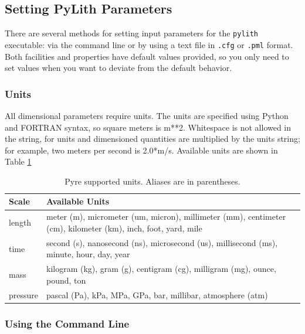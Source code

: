 \subsection{\label{sec:setting:parameters}Setting PyLith Parameters}

There are several methods for setting input parameters for the \texttt{pylith}
executable: via the command line or by using a text file in \texttt{.cfg}
or \texttt{.pml} format. Both facilities and properties have default
values provided, so you only need to set values when you want to deviate
from the default behavior.


\subsubsection{Units}

All dimensional parameters require units. The units are specified
using Python and FORTRAN syntax, so square meters is m{*}{*}2. Whitespace
is not allowed in the string, for units and dimensioned quantities
are multiplied by the units string; for example, two meters per second
is 2.0{*}m/s. Available units are shown in Table \ref{tab:pyre:units}

\noindent \begin{center}
\begin{table}[H]
\centering{}\caption{\label{tab:pyre:units}Pyre supported units. Aliases are in parentheses.}
\begin{tabular}{|>{\raggedright}p{0.9in}|>{\raggedright}p{4in}|}
\hline 
\textbf{Scale} & \textbf{Available Units}\tabularnewline
\hline 
\hline 
length & meter (m), micrometer (um, micron), millimeter (mm), centimeter (cm),
kilometer (km), inch, foot, yard, mile\tabularnewline
\hline 
time & second (s), nanosecond (ns), microsecond (us), millisecond (ms), minute,
hour, day, year\tabularnewline
\hline 
mass & kilogram (kg), gram (g), centigram (cg), milligram (mg), ounce, pound,
ton\tabularnewline
\hline 
pressure & pascal (Pa), kPa, MPa, GPa, bar, millibar, atmosphere (atm)\tabularnewline
\hline 
\end{tabular}
\end{table}

\par\end{center}


\subsubsection{Using the Command Line}

